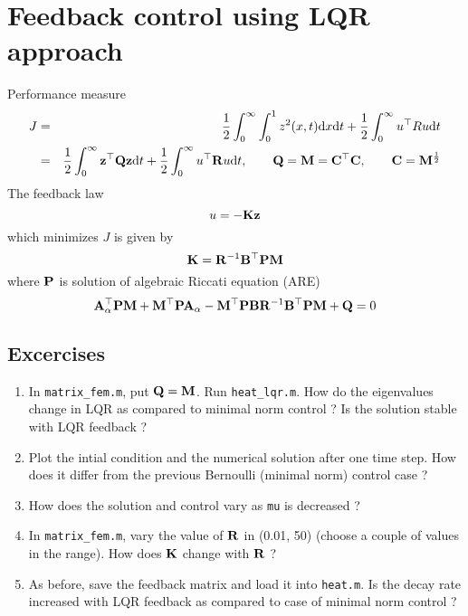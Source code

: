 \documentclass[12pt]{article}
\begin{document}

\section{Feedback control using LQR approach}
Performance measure
\begin{eqnarray*}
J &=& \frac{1}{2}\int_0^\infty \int_0^1 z^2(x,t) \textrm{d} x \textrm{d} t + \frac{1}{2} \int_0^\infty u^\top R u \textrm{d} t \\
&=& \frac{1}{2}\int_0^\infty {\mathbf z}^\top {\mathbf Q} {\mathbf z} \textrm{d} t + \frac{1}{2} \int_0^\infty u^\top {\mathbf R} u \textrm{d}   
t , \qquad {\mathbf Q} = {\mathbf M} = {\mathbf C}^\top {\mathbf C}, \qquad {\mathbf C} = {\mathbf M}^\frac{1}{2}
\end{eqnarray*}
The feedback law
\[
u = -{\mathbf K} {\mathbf z}
\]
which minimizes $J$ is given by
\[
{\mathbf K} = {\mathbf R}^{-1} {\mathbf B}^\top {\mathbf P} {\mathbf M}
\]
where ${\mathbf P}$ is solution of algebraic Riccati equation (ARE)
\[
{\mathbf A}^\top_\alpha {\mathbf P} {\mathbf M} + {\mathbf M}^\top {\mathbf P} {\mathbf A}_\alpha - {\mathbf M}^\top {\mathbf P} {\mathbf B} {\mathbf R}^{-1} {\mathbf B}^\top {\mathbf P} {\mathbf M} + {\mathbf Q} = 0
\]

\subsection{Excercises}

\begin{enumerate}

\item In {\tt matrix\_fem.m}, put ${\mathbf Q} = {\mathbf M}$. Run {\tt heat\_lqr.m}. How do the eigenvalues change in LQR as compared to minimal norm control ? Is the solution stable with LQR feedback ?

\item Plot the intial condition and the numerical solution after one time step. How does it differ from the previous Bernoulli (minimal norm) control case ?

\item How does the solution and control vary as {\tt mu} is decreased ?

\item In {\tt matrix\_fem.m}, vary the value of ${\mathbf R}$ in (0.01, 50) (choose a couple of values in the range). How does ${\mathbf K}$ change with ${\mathbf R}$ ?

\item As before, save the feedback matrix and load it into {\tt heat.m}. Is the decay rate increased with LQR feedback as compared to case of minimal norm control ?
\end{enumerate}
\end{document}
